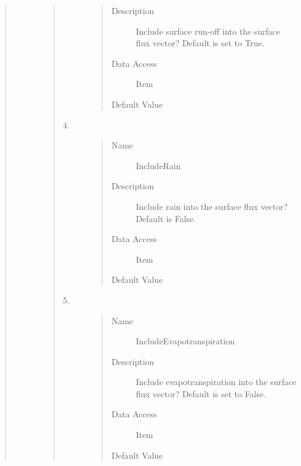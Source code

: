 \documentclass[letterpaper,10pt,english]{sphinxmanual}
\begin{document}
\begin{quote}
\begin{description}
\begin{quote}
\begin{description}
\begin{quote}
\begin{description}
\item[{Description}] \leavevmode
Include surface run-off into the surface flux vector? Default is set to True.

\item[{Data Access}] \leavevmode
Item

\item[{Default Value}] \leavevmode
{}

\end{description}\end{quote}

\item[{4.}] \leavevmode\begin{quote}\begin{description}
\item[{Name}] \leavevmode
IncludeRain

\item[{Description}] \leavevmode
Include rain into the surface flux vector? Default is False.

\item[{Data Access}] \leavevmode
Item

\item[{Default Value}] \leavevmode
{}

\end{description}\end{quote}

\item[{5.}] \leavevmode\begin{quote}\begin{description}
\item[{Name}] \leavevmode
IncludeEvapotranspiration

\item[{Description}] \leavevmode
Include evapotranspiration into the surface flux vector? Default is set to False.

\item[{Data Access}] \leavevmode
Item

\item[{Default Value}] \leavevmode
{}


\end{description}
\end{quote}
\end{description}
\end{quote}
\end{description}
\end{quote}
\end{document}
